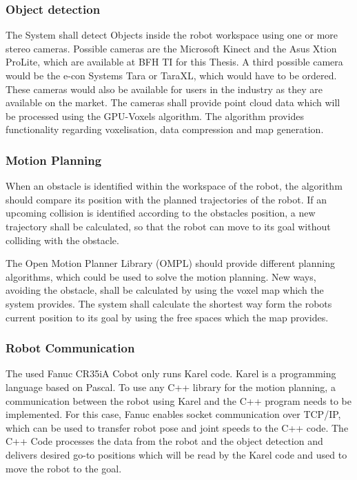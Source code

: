 \subsubsection{Object detection}
The System shall detect Objects inside the robot workspace using one or more stereo cameras.
Possible cameras are the Microsoft Kinect and the Asus Xtion ProLite, which are available at BFH TI for this Thesis. A third possible camera would be the e-con Systems Tara or TaraXL, which would have to be ordered. These cameras would also be available for users in the industry as they are available on the market. The cameras shall provide point cloud data which will be processed using the GPU-Voxels algorithm. The algorithm provides functionality regarding voxelisation, data compression and map generation.

\subsubsection{Motion Planning}
When an obstacle is identified within the workspace of the robot, the algorithm should compare its position with the planned trajectories of the robot. If an upcoming collision is identified according to the obstacles position, a new trajectory shall be calculated, so that the robot can move to its goal without colliding with the obstacle.

The Open Motion Planner Library (OMPL) should provide different planning algorithms, which could be used to solve the motion planning. New ways, avoiding the obstacle, shall be calculated by using the voxel map which the system provides. The system shall calculate the shortest way form the robots current position to its goal by using the free spaces which the map provides.

\subsubsection{Robot Communication}
The used Fanuc CR35iA Cobot only runs Karel code. Karel is a programming language based on Pascal. To use any C++ library for the motion planning, a communication between the robot using Karel and the C++ program needs to be implemented. For this case, Fanuc enables socket communication over TCP/IP, which can be used to transfer robot pose and joint speeds to the C++ code. The C++ Code processes the data from the robot and the object detection and delivers desired go-to positions which will be read by the Karel code and used to move the robot to the goal.

